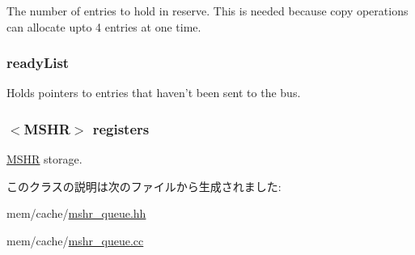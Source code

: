 \label{classMSHRQueue_a2c97f85062902d3990c3a9c163306547}
The number of entries to hold in reserve. This is needed because copy operations can allocate upto 4 entries at one time. \hypertarget{classMSHRQueue_ab090e7fb494c0f9af81d19d1959684a0}{
\subsubsection[{readyList}]{ {\bf readyList}}}
\label{classMSHRQueue_ab090e7fb494c0f9af81d19d1959684a0}
Holds pointers to entries that haven't been sent to the bus. \hypertarget{classMSHRQueue_a61e75efe923d1fa4bbb72f426a219b7e}{
\subsubsection[{registers}]{$<${\bf MSHR}$>$ {\bf registers}}}
\label{classMSHRQueue_a61e75efe923d1fa4bbb72f426a219b7e}
\hyperlink{classMSHR}{MSHR} storage. 

このクラスの説明は次のファイルから生成されました:\begin{DoxyCompactItemize}
\item 
mem/cache/\hyperlink{mshr__queue_8hh}{mshr\_\-queue.hh}\item 
mem/cache/\hyperlink{mshr__queue_8cc}{mshr\_\-queue.cc}\end{DoxyCompactItemize}
